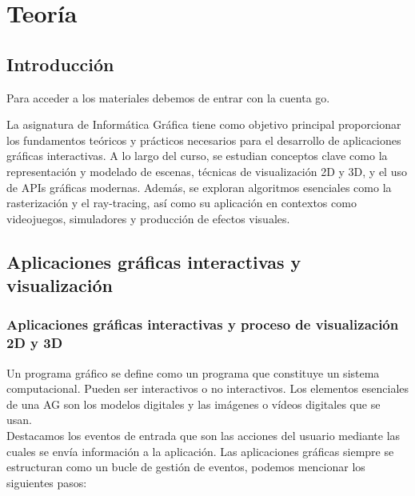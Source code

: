 \documentclass[12pt]{book} %
\begin{document}
\part{Teoría}

\hypertarget{introducciuxf3n}{%
\chapter{Introducción}\label{introducciuxf3n}}

Para acceder a los materiales debemos de entrar con la cuenta go.

La asignatura de Informática Gráfica tiene como objetivo principal
proporcionar los fundamentos teóricos y prácticos necesarios para el
desarrollo de aplicaciones gráficas interactivas. A lo largo del curso,
se estudian conceptos clave como la representación y modelado de
escenas, técnicas de visualización 2D y 3D, y el uso de APIs gráficas
modernas. Además, se exploran algoritmos esenciales como la
rasterización y el ray-tracing, así como su aplicación en contextos como
videojuegos, simuladores y producción de efectos visuales.

\hypertarget{aplicaciones-gruxe1ficas-interactivas-y-visualizaciuxf3n}{%
\chapter{Aplicaciones gráficas interactivas y
visualización}\label{aplicaciones-gruxe1ficas-interactivas-y-visualizaciuxf3n}}

\hypertarget{aplicaciones-gruxe1ficas-interactivas-y-proceso-de-visualizaciuxf3n-2d-y-3d}{%
\section{Aplicaciones gráficas interactivas y proceso de visualización
2D y
3D}\label{aplicaciones-gruxe1ficas-interactivas-y-proceso-de-visualizaciuxf3n-2d-y-3d}}

Un programa gráfico se define como un programa que constituye un sistema
computacional. Pueden ser interactivos o no interactivos. Los elementos
esenciales de una AG son los modelos digitales y las imágenes o vídeos
digitales que se usan.\\
Destacamos los eventos de entrada que son las acciones del usuario
mediante las cuales se envía información a la aplicación. Las
aplicaciones gráficas siempre se estructuran como un bucle de gestión de
eventos, podemos mencionar los siguientes pasos:
\end{document}
